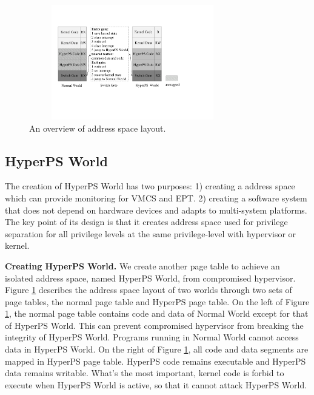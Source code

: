 ﻿\documentclass[conference]{IEEEtran}
\begin{document}



\begin{figure}
\centerline{\includegraphics[width=9cm, height=5cm]{pdfvmcs2.pdf}}%
\caption{An overview of address space layout.} \label{fig2}
\end{figure}


\subsection{HyperPS World} \label {HWorld}

The creation of HyperPS World has two purposes: 1) creating a address space which can provide monitoring for VMCS and EPT. 2) creating a software system that does not depend on hardware devices and adapts to multi-system platforms. The key point of its design is that it creates address space used for privilege separation for all privilege levels at the same privilege-level with hypervisor or kernel. 

\textbf{Creating HyperPS World.}
We create another page table to achieve an isolated address space, named HyperPS World, from compromised hypervisor.
Figure \ref{fig2} describes the address space layout of two worlds through two sets of page tables, the normal page table and HyperPS page table. On the left of Figure \ref{fig2}, the normal page table contains code and data of Normal World except for that of HyperPS World. This can prevent compromised hypervisor from breaking the integrity of HyperPS World. Programs running in Normal World cannot access data in HyperPS World. On the right of Figure \ref{fig2}, all code and data segments are mapped in HyperPS page table.
HyperPS code remains executable and HyperPS data remains writable. What's the most important, kernel code is forbid to execute when HyperPS World is active, so that it cannot attack HyperPS World.
\end{document}
